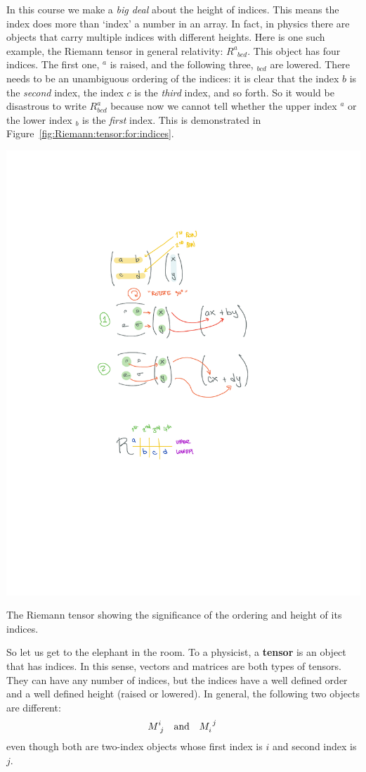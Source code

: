 In this course we make a \emph{big deal} about the height of indices. This means the index does more than  `index' a number in an array. In fact, in physics there are objects that carry multiple indices with different heights. Here is one such example, the Riemann tensor in general relativity: $R^a_{\phantom{a}bcd}$. This object has four indices. The first one, $^a$ is raised, and the following three, $_{bcd}$ are lowered. There needs to be an unambiguous ordering of the indices: it is clear that the index $b$ is the \emph{second} index, the index $c$ is the \emph{third} index, and so forth. So it would be disastrous to write $R^a_{bcd}$ because now we cannot tell whether the upper index $^a$ or the lower index $_b$ is the \emph{first} index. This is demonstrated in Figure~\ref{fig:Riemann:tensor:for:indices}.
\begin{marginfigure}%
    \includegraphics[width=.8\textwidth]{figures/Rabcd_eg.pdf}
    \caption{The Riemann tensor showing the significance of the ordering and height of its indices.}
    \label{fig:Riemann:tensor:for:indices}
\end{marginfigure}

So let us get to the elephant in the room. To a physicist, a \textbf{tensor} is an object that has indices. In this sense, vectors and matrices are both types of tensors. They can have any number of indices, but the indices have a well defined order and a well defined height (raised or lowered). In general, the following two objects are different:
\begin{align}
    M\aij{i}{j} &&\text{and} && M_i^{\phantom{i}j} \,
\end{align}
even though both are two-index objects whose first index is $i$ and second index is $j$. 

